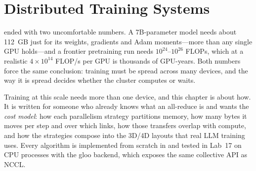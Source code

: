 \chapter{Distributed Training Systems}\label{ch:distributed}

 ended with two uncomfortable numbers. A 7B-parameter model needs about
\SI{112}{GB} just for its weights, gradients and Adam moments---more than any single GPU holds---and
a frontier pretraining run needs $10^{24}$--$10^{26}$ FLOPs, which at a realistic
$4\times10^{14}$ FLOP/s per GPU is thousands of GPU-years. Both numbers force the same
conclusion: training must be spread across many devices, and the way it is spread decides
whether the cluster computes or waits.

Training at this scale needs more than one device, and this chapter is about how. It is written for
someone who already knows what an all-reduce is and wants the \emph{cost model}: how each
parallelism strategy partitions memory, how many bytes it moves per step and over which links,
how those transfers overlap with compute, and how the strategies compose into the 3D/4D
layouts that real LLM training uses. Every algorithm is implemented from scratch in
 and tested in Lab~17 on CPU processes with the gloo backend, which exposes the
same collective API as NCCL.

